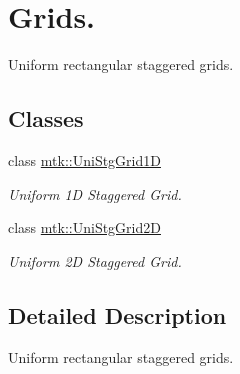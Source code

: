 \hypertarget{group__c06-grids}{\section{Grids.}
\label{group__c06-grids}
}


Uniform rectangular staggered grids.  


\subsection*{Classes}
\begin{DoxyCompactItemize}
\item 
class \hyperlink{classmtk_1_1UniStgGrid1D}{mtk\+::\+Uni\+Stg\+Grid1\+D}
\begin{DoxyCompactList}\small\item\em Uniform 1\+D Staggered Grid. \end{DoxyCompactList}\item 
class \hyperlink{classmtk_1_1UniStgGrid2D}{mtk\+::\+Uni\+Stg\+Grid2\+D}
\begin{DoxyCompactList}\small\item\em Uniform 2\+D Staggered Grid. \end{DoxyCompactList}\end{DoxyCompactItemize}


\subsection{Detailed Description}
Uniform rectangular staggered grids. 